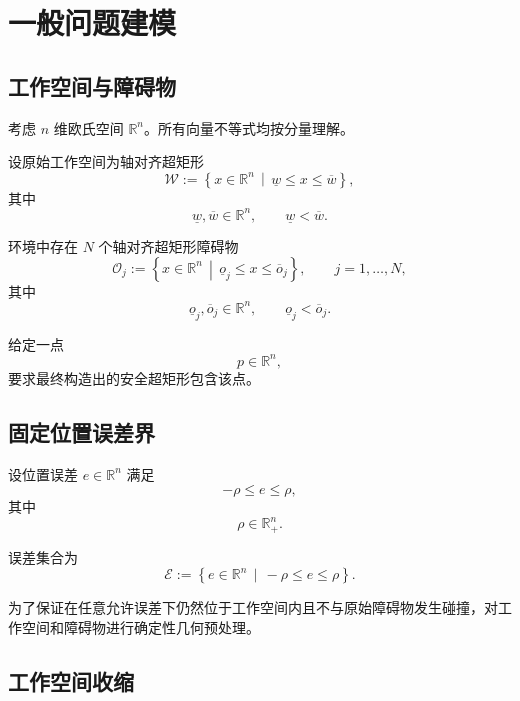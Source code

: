 \documentclass[UTF8,12pt,a4paper]{ctexart}
\newcommand{\R}{\mathbb{R}}
\begin{document}
\section{一般问题建模}

\subsection{工作空间与障碍物}

考虑 $n$ 维欧氏空间 $\R^n$。所有向量不等式均按分量理解。

设原始工作空间为轴对齐超矩形
\begin{equation}
    \mathcal W
    :=
    \left\{
    x\in\R^n
    \,\middle|\,
    \underline w\le x\le \overline w
    \right\},
\end{equation}
其中
\[
\underline w,\overline w\in\R^n,
\qquad
\underline w<\overline w.
\]

环境中存在 $N$ 个轴对齐超矩形障碍物
\begin{equation}
    \mathcal O_j
    :=
    \left\{
    x\in\R^n
    \,\middle|\,
    \underline o_j\le x\le \overline o_j
    \right\},
    \qquad
    j=1,\ldots,N,
\end{equation}
其中
\[
\underline o_j,\overline o_j\in\R^n,
\qquad
\underline o_j<\overline o_j.
\]

给定一点
\begin{equation}
    p\in\R^n,
\end{equation}
要求最终构造出的安全超矩形包含该点。

\subsection{固定位置误差界}

设位置误差 $e\in\R^n$ 满足
\begin{equation}
    -\rho\le e\le\rho,
\end{equation}
其中
\[
\rho\in\R_+^n.
\]

误差集合为
\begin{equation}
    \mathcal E
    :=
    \left\{
    e\in\R^n
    \,\middle|\,
    -\rho\le e\le\rho
    \right\}.
\end{equation}

为了保证在任意允许误差下仍然位于工作空间内且不与原始障碍物发生碰撞，对工作空间和障碍物进行确定性几何预处理。

\subsection{工作空间收缩}
\end{document}
